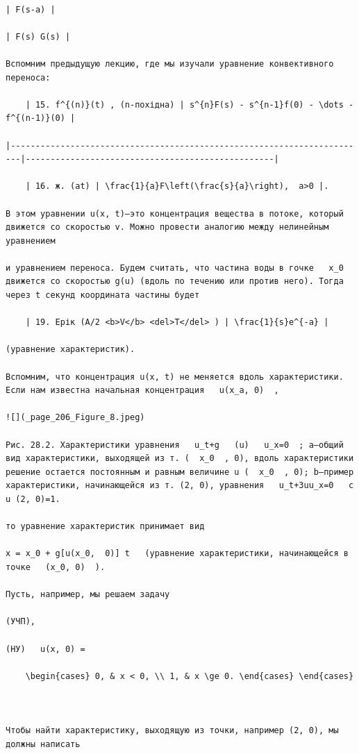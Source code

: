 \documentclass[
]{article}
\begin{document}
\begin{verbatim}

| F(s-a) |

| F(s) G(s) |

Вспомним предыдущую лекцию, где мы изучали уравнение конвективного переноса:

    | 15. f^{(n)}(t) , (n-похідна) | s^{n}F(s) - s^{n-1}f(0) - \dots - f^{(n-1)}(0) |

|------------------------------------------------------------------------|--------------------------------------------------|

    | 16. ж. (at) | \frac{1}{a}F\left(\frac{s}{a}\right),  a>0 |.

В этом уравнении u(x, t)—это концентрация вещества в потоке, который движется со скоростью v. Можно провести аналогию между нелинейным уравнением

и уравнением переноса. Будем считать, что частина воды в гочке   x_0   движется со скоростью g(u) (вдоль по течению или против него). Тогда через t секунд координата частины будет

    | 19. Ерік (A/2 <b>V</b> <del>T</del> ) | \frac{1}{s}e^{-a} |

(уравнение характеристик).

Вспомним, что концентрация u(x, t) не меняется вдоль характеристики. Если нам известна начальная концентрация   u(x_a, 0)  ,

![](_page_206_Figure_8.jpeg)

Рис. 28.2. Характеристики уравнения   u_t+g   (u)   u_x=0  ; a—общий вид характеристики, выходящей из т. (  x_0  , 0), вдоль характеристики решение остается постоянным и равным величине u (  x_0  , 0); b—пример характеристики, начинающейся из т. (2, 0), уравнения   u_t+3uu_x=0   с u (2, 0)=1.

то уравнение характеристик принимает вид

x = x_0 + g[u(x_0,  0)] t   (уравнение характеристики, начинающейся в точке   (x_0, 0)  ).

Пусть, например, мы решаем задачу

(УЧП),

(НУ)   u(x, 0) =

    \begin{cases} 0, & x < 0, \\ 1, & x \ge 0. \end{cases} \end{cases}

  

Чтобы найти характеристику, выходящую из точки, например (2, 0), мы должны написать


\end{verbatim}
\end{document}
